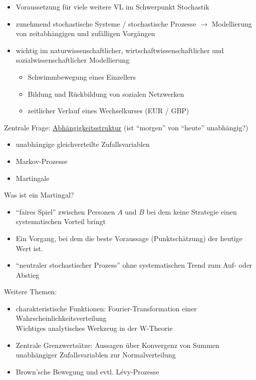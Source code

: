
\setcounter{chapter}{-1}
\begin{itemize}
\item Voraussetzung für viele weitere VL im Schwerpunkt Stochastik
\item zunehmend stochastische Systeme / stochastische Prozesse $\to$ Modellierung von zeitabhängigen und zufälligen Vorgängen
\item wichtig im naturwissenschaftlicher, wirtschaftwissenschaftlicher und sozialwissenschaftlicher Modellierung
\begin{itemize}
\item Schwimmbewegung eines Einzellers
\item Bildung und Rückbildung von sozialen Netzwerken
\item zeitlicher Verlauf eines Wechselkurses (EUR / GBP)
\end{itemize}
\end{itemize}

Zentrale Frage: \underline{Abhängigkeitsstruktur} (ist ``morgen'' von ``heute'' unabhängig?)
\begin{itemize}
\item unabhängige gleichverteilte Zufallsvariablen
\item Markov-Prozesse
\item Martingale
\end{itemize}

Was ist ein Martingal?
\begin{itemize}
\item ``faires Spiel'' zwischen Personen $A$ und $B$ bei dem keine Strategie einen systematischen Vorteil bringt
\item Ein Vorgang, bei dem die beste Voraussage (Punktschätzung) der heutige Wert ist.
\item ``neutraler stochastischer Prozess'' ohne systematischen Trend zum Auf- oder Abstieg
\end{itemize}

Weitere Themen:
\begin{itemize}
\item charakteristische Funktionen: Fourier-Transformation einer Wahrscheinlichkeitsverteilung\\
Wichtiges analytisches Werkzeug in der W-Theorie
\item Zentrale Grenzwertsätze: Aussagen über Konvergenz von Summen unabhängiger Zufallsvariablen zur Normalverteilung
\item Brown'sche Bewegung und evtl. Lévy-Prozesse
\end{itemize}
